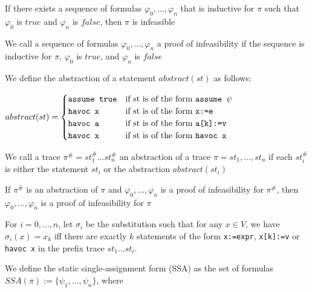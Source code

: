 \documentclass[landscape, a4paper]{article}
\begin{document}
\begin{minipage}[t]{0.2\linewidth}
\begin{betterlist}
		\item If there exists a sequence of formulas $\varphi_0, \ldots , \varphi_n$ that is inductive for $\pi$ such that $\varphi_0$ is $true$ and $\varphi_n$ is $false$, then $\pi$ is infeasible
		\item \color{orange}We call a sequence of formulas $\varphi_0, \ldots , \varphi_n$ a \alert{proof of infeasibility} if the sequence is inductive for $\pi$, $\varphi_0$ is $true$, and $\varphi_n$ is $false$\color{black}
		\item We define the \alert{abstraction of a statement} $abstract(st)$ as follows:

		$abstract(st) = \begin{cases}
				\verb|assume true| & \text{if st is of the form } \verb|assume |\psi \\
				\verb|havoc x|     & \text{if st is of the form } \verb|x:=e|        \\
				\verb|havoc a|     & \text{if st is of the form } \verb|a[k]:=v|     \\
				\verb|havoc x|     & \text{if st is of the form } \verb|havoc x|
			\end{cases}$
		\item We call a trace $\pi^\# = st^\#_1 \ldots st^\#_n$ an \alert{abstraction of a trace} $\pi = st_1, \ldots, st_n$ if each $st^\#_i$ is either the statement $st_i$ or the abstraction $abstract(st_i)$
		\begin{betterlist}
			\item If $\pi^\#$ is an abstraction of $\pi$ and $\varphi_0, \ldots , \varphi_n$ is a proof of infeasibility for $\pi^\#$, then $\varphi_0, \ldots , \varphi_n$ is a proof of infeasibility for $\pi$
		\end{betterlist}
		\item For $i = 0, \ldots, n$, let $\sigma_i$ be the substitution such that for any $x \in V$, we have $\sigma_i(x) = x_k$ iff there are exactly $k$ statements of the form \verb|x:=expr|, \verb|x[k]:=v| or \verb|havoc x| in the prefix trace $st_1 \ldots st_i$.

      \color{orange}We define the \alert{static single-assignment form (SSA)} as the set of formulas $SSA(\pi) := \{\psi_1, \ldots, \psi_n\}$, where


\end{betterlist}
\end{minipage}
\end{document}
